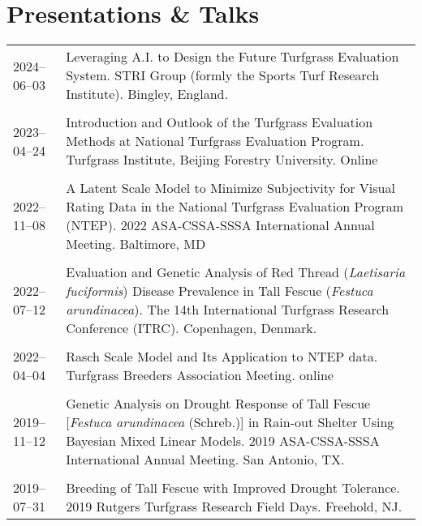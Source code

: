 \documentclass[letterpaper,11pt, english]{article}
\begin{document}
\section{Presentations \& Talks}
\begin{flushleft}
  \begin{tabularx}{\textwidth}{@{}lX@{}}
    \\2024--06--03 \hspace{1cm} & Leveraging A.I. to Design the Future Turfgrass Evaluation System. STRI Group (formly the Sports Turf Research Institute). Bingley, England.  \\
    \\[-0.2cm] 
    2023--04--24 \hspace{1cm} & Introduction and Outlook of the Turfgrass Evaluation Methods at National Turfgrass Evaluation Program. Turfgrass Institute, Beijing Forestry University. Online \\
    \\[-0.2cm] 
    2022--11--08 \hspace{1cm} & A Latent Scale Model to Minimize Subjectivity for Visual Rating Data in the National Turfgrass Evaluation Program (NTEP). 2022 ASA-CSSA-SSSA International Annual Meeting. Baltimore, MD \\
    \\[-0.2cm] 
    2022--07--12 \hspace{1cm} & Evaluation and Genetic Analysis of Red Thread (\textit{Laetisaria fuciformis}) Disease Prevalence in Tall Fescue (\textit{Festuca arundinacea}). The 14th International Turfgrass Research Conference (ITRC). Copenhagen, Denmark. \\
    \\[-0.2cm]
    2022--04--04 \hspace{1cm} & Rasch Scale Model and Its Application to NTEP data. Turfgrass Breeders Association Meeting. online \\
    \\[-0.2cm]
    2019--11--12 \hspace{1cm} & Genetic Analysis on Drought Response of Tall Fescue [\textit{Festuca arundinacea} (Schreb.)] in Rain-out Shelter Using Bayesian Mixed Linear Models. 2019 ASA-CSSA-SSSA International Annual Meeting. San Antonio, TX. \\
      \\[-0.2cm]
    2019--07--31 \hspace{1cm} & Breeding of Tall Fescue with Improved Drought Tolerance. 2019 Rutgers Turfgrass Research Field Days. Freehold, NJ. \\

\end{tabularx}
\end{flushleft}
\end{document}
